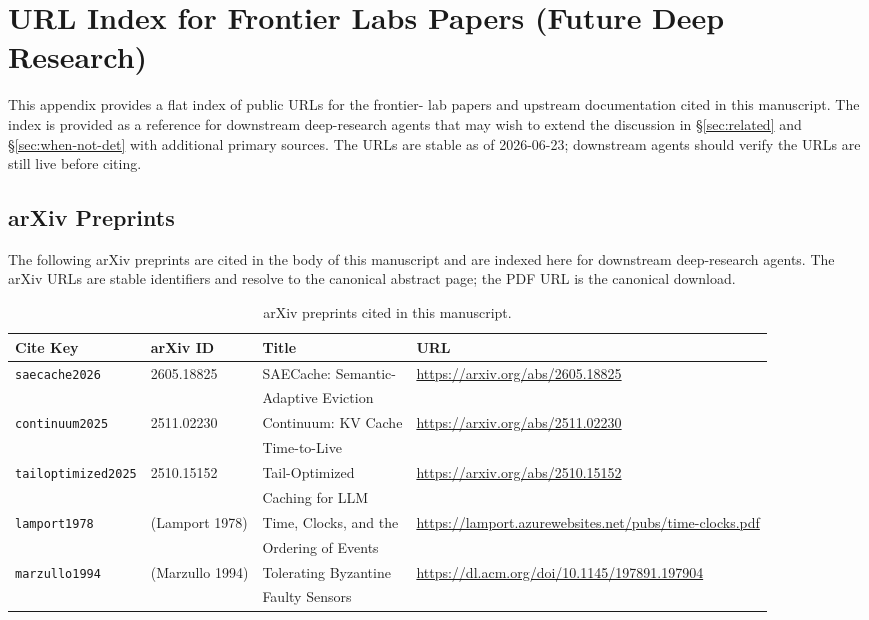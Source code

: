 \setcounter{section}{15}
\section{URL Index for Frontier Labs Papers (Future Deep Research)}
\label{app:url-index}

This appendix provides a flat index of public URLs for the frontier-
lab papers and upstream documentation cited in this manuscript. The
index is provided as a reference for downstream deep-research agents
that may wish to extend the discussion in \S\ref{sec:related} and
\S\ref{sec:when-not-det} with additional primary sources. The URLs
are stable as of 2026-06-23; downstream agents should verify the
URLs are still live before citing.

\subsection{arXiv Preprints}

The following arXiv preprints are cited in the body of this manuscript
and are indexed here for downstream deep-research agents. The arXiv
URLs are stable identifiers and resolve to the canonical abstract
page; the PDF URL is the canonical download.

\begin{table}[h]
\centering
\caption{arXiv preprints cited in this manuscript.}
\label{tab:arxiv-index}
\vspace{2pt}
\begin{tabular}{@{}llll@{}}
\toprule
Cite Key & arXiv ID & Title & URL \\
\midrule
\texttt{saecache2026} & 2605.18825 & SAECache: Semantic- & \url{https://arxiv.org/abs/2605.18825} \\
                      &            & Adaptive Eviction    & \\
\texttt{continuum2025} & 2511.02230 & Continuum: KV Cache & \url{https://arxiv.org/abs/2511.02230} \\
                       &            & Time-to-Live         & \\
\texttt{tailoptimized2025} & 2510.15152 & Tail-Optimized & \url{https://arxiv.org/abs/2510.15152} \\
                           &            & Caching for LLM      & \\
\texttt{lamport1978} & (Lamport 1978) & Time, Clocks, and the & \url{https://lamport.azurewebsites.net/pubs/time-clocks.pdf} \\
                     &                & Ordering of Events    & \\
\texttt{marzullo1994} & (Marzullo 1994) & Tolerating Byzantine & \url{https://dl.acm.org/doi/10.1145/197891.197904} \\
                      &                 & Faulty Sensors        & \\
\bottomrule
\end{tabular}
\end{table}


